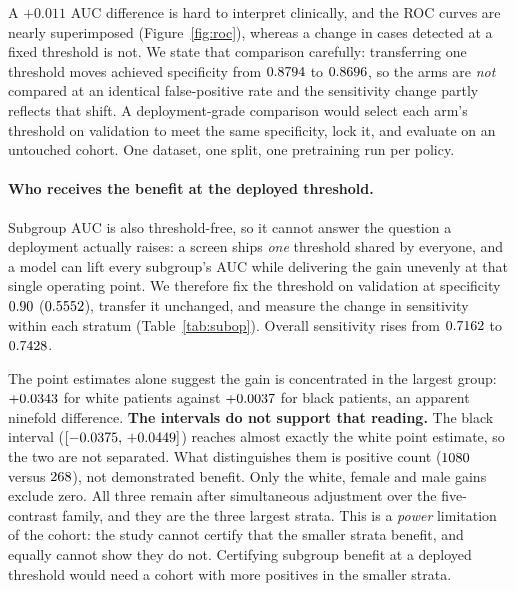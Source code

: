 \documentclass{article}
\begin{document}
A $+0.011$ AUC difference is hard to interpret clinically, and the ROC curves are
nearly superimposed (Figure~\ref{fig:roc}), whereas a change in cases detected at
a fixed threshold is not. We state that comparison carefully:
transferring one threshold moves achieved specificity from $0.8794$
to $0.8696$, so the arms are \emph{not} compared at an
identical false-positive rate and the sensitivity change partly reflects that
shift. A deployment-grade comparison would select each arm's threshold on
validation to meet the same specificity, lock it, and evaluate on an untouched
cohort. One dataset, one split, one pretraining run per policy.

\paragraph{Who receives the benefit at the deployed threshold.} Subgroup AUC is
also threshold-free, so it cannot answer the question a deployment actually
raises: a screen ships \emph{one} threshold shared by everyone, and a model can
lift every subgroup's AUC while delivering the gain unevenly at that single
operating point. We therefore fix the threshold on validation at specificity
$0.90$ ($0.5552$), transfer it unchanged, and measure the
change in sensitivity within each stratum
(Table~\ref{tab:subop}). Overall sensitivity rises from $0.7162$ to
$0.7428$.

The point estimates alone suggest the gain is concentrated in the largest group:
$+0.0343$ for white patients against $+0.0037$ for black patients, an
apparent ninefold difference. \textbf{The intervals do not support that reading.}
The black interval ($[-0.0375,\,+0.0449]$) reaches almost exactly the white point
estimate, so the two are not separated. What distinguishes them is positive
count ($1080$ versus $268$), not demonstrated benefit. Only
the white, female and male gains exclude zero. All three remain after simultaneous
adjustment over the five-contrast family, and they are the three largest strata.
This is a \emph{power} limitation of the cohort: the study cannot certify
that the smaller strata benefit, and equally cannot show they do not. Certifying
subgroup benefit at a deployed
threshold would need a cohort with more positives in the smaller strata.
\end{document}
